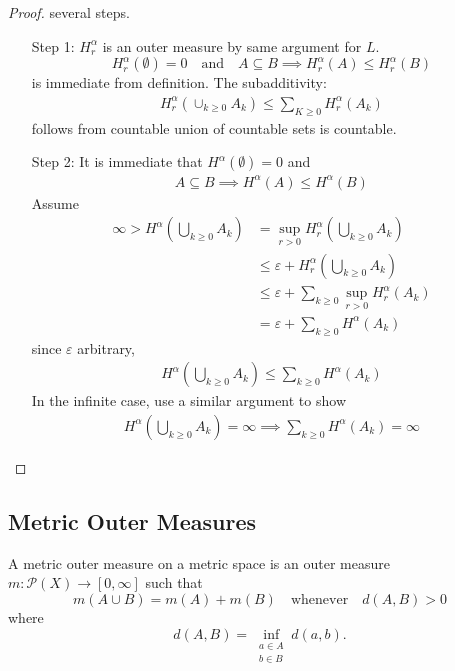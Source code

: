 \begin{proof} several steps.
	\begin{enumerate}
		\item[Step 1:] $H_{r}^{\alpha}$ is an outer measure by same argument for $L$.
			\[
				H_{r}^{\alpha} (\emptyset)= 0 \quad \text{and} \quad A \subseteq B \implies H_{r}^{\alpha} (A) \leq H_{r}^{\alpha} (B)
			\]
			is immediate from definition.
			The subadditivity:
			\begin{align*}
			H_{r}^{\alpha} ( \cup_{k \geq 0} A_{k}) \leq \sum_{K \geq 0} H_{r}^{\alpha} (A_k)
			\end{align*} follows from countable union of countable sets is countable.

		\item[Step 2:] It is immediate that $H^{\alpha} (\emptyset) = 0$ and
			\begin{align*}
			A \subseteq B \implies H^{\alpha} (A) \leq H^{\alpha}(B)
			\end{align*} Assume
			\begin{align*}
				\infty > H^{\alpha}( \bigcup_{k \geq 0} A_k ) &= \sup_{r > 0} H_{r}^{\alpha} ( \bigcup_{k \geq 0} A_k) \\
															  &\leq \varepsilon + H_{r}^{\alpha} ( \bigcup_{k \geq 0} A_k) \\
															  &\leq \varepsilon + \sum_{k \geq 0} \sup_{r > 0} H_{r}^{\alpha} ( A_k) \\
															  &= \varepsilon + \sum_{k \geq 0} H^{\alpha} ( A_k)
			\end{align*}
			since $\varepsilon$ arbitrary,
			\begin{align*}
				H^{\alpha} ( \bigcup_{k \geq 0} A_k) \leq \sum_{k \geq 0} H^{\alpha} ( A_k)
			\end{align*}
			In the infinite case, use a similar argument to show
			\begin{align*}
				H^{\alpha} ( \bigcup_{k \geq 0} A_k) = \infty \implies \sum_{k \geq 0} H^{\alpha} ( A_k) = \infty
			\end{align*}
	\end{enumerate}
\end{proof}

\subsection{Metric Outer Measures}

\begin{definition}
	A metric outer measure on a metric space is an outer measure $m : \mathcal{P}(X) \to [0,\infty]$ such that
	\[
		m(A \cup B) = m(A) + m(B) \quad \text{whenever} \quad d(A,B) > 0
	\]
	where
	\[
		d(A,B) = \inf_{\substack{a \in A \\ b \in B}} d(a,b).
	\]
\end{definition}


